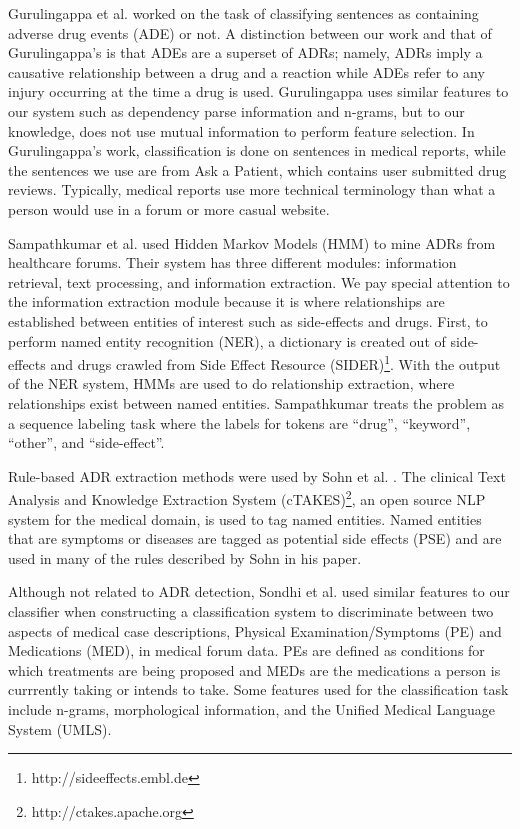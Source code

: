 \documentclass{acm_proc_article-sp}
\begin{document}
Gurulingappa et al. \cite{Gurulingappa} worked on the task of classifying sentences as containing adverse drug events (ADE) or not. A distinction between our work and that of Gurulingappa's is that ADEs are a superset of ADRs; namely, ADRs imply a causative relationship between a drug and a reaction while ADEs refer to any injury occurring at the time a drug is used. Gurulingappa uses similar features to our system such as dependency parse information and n-grams, but to our knowledge, does not use mutual information to perform feature selection. In Gurulingappa's work, classification is done on sentences in medical reports, while the sentences we use are from Ask a Patient, which contains user submitted drug reviews. Typically, medical reports use more technical terminology than what a person would use in a forum or more casual website.

Sampathkumar et al. \cite{Sampathkumar} used Hidden Markov Models (HMM) to mine ADRs from healthcare forums. Their system has three different modules: information retrieval, text processing, and information extraction. We pay special attention to the information extraction module because it is where relationships are established between entities of interest such as side-effects and drugs. First, to perform named entity recognition (NER), a dictionary is created out of side-effects and drugs crawled from Side Effect Resource (SIDER)\footnote{http://sideeffects.embl.de}. With the output of the NER system, HMMs are used to do relationship extraction, where relationships exist between named entities. Sampathkumar treats the problem as a sequence labeling task where the labels for tokens are ``drug'', ``keyword'', ``other'', and ``side-effect''.

Rule-based ADR extraction methods were used by Sohn et al. \cite{Sohn}. The clinical Text Analysis and Knowledge Extraction System (cTAKES)\footnote{http://ctakes.apache.org}, an open source NLP system for the medical domain, is used to tag named entities. Named entities that are symptoms or diseases are tagged as potential side effects (PSE) and are used in many of the rules described by Sohn in his paper.

Although not related to ADR detection, Sondhi et al. \cite{Sondhi}  used similar features to our classifier when constructing a classification system to discriminate between two aspects of medical case descriptions, Physical Examination/Symptoms (PE) and Medications (MED), in medical forum data. PEs are defined as conditions for which treatments are being proposed and MEDs are the medications a person is currrently taking or intends to take. Some features used for the classification task include n-grams, morphological information, and the Unified Medical Language System (UMLS).
\end{document}
